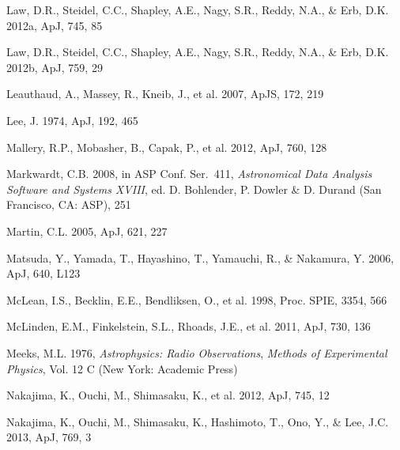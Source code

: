 \documentclass{emulateapj}
\def\apj{ApJ}
\def\apjs{ApJS}
\def\asp{ASP Conf. Ser.}
\def\spie{Proc. SPIE}
\begin{document}
\begin{thebibliography}{}
 Law, D.R., Steidel, C.C., Shapley, A.E., Nagy, S.R., Reddy, N.A., \& Erb, D.K. 2012a, \apj, 745, 85

 Law, D.R., Steidel, C.C., Shapley, A.E., Nagy, S.R., Reddy, N.A., \& Erb, D.K. 2012b, \apj, 759, 29

 Leauthaud, A., Massey, R., Kneib, J., et al. 2007, \apjs, 172, 219 

 Lee, J. 1974, \apj, 192, 465

 Mallery, R.P., Mobasher, B., Capak, P., et al. 2012, \apj, 760, 128

 Markwardt, C.B. 2008, in \asp\ 411, \textit{Astronomical Data Analysis Software and Systems XVIII}, ed. D. Bohlender, P. Dowler \& D. Durand (San Francisco, CA: ASP), 251

 Martin, C.L. 2005, \apj, 621, 227

 Matsuda, Y., Yamada, T., Hayashino, T., Yamauchi, R., \& Nakamura, Y. 2006, \apj, 640, L123 

 McLean, I.S., Becklin, E.E., Bendliksen, O., et al. 1998, \spie, 3354, 566

 McLinden, E.M., Finkelstein, S.L., Rhoads, J.E., et al. 2011, \apj, 730, 136

 Meeks, M.L. 1976, \textit{Astrophysics: Radio Observations}, \textit{Methods of Experimental Physics}, Vol. 12 C (New York: Academic Press) 

 Nakajima, K., Ouchi, M., Shimasaku, K., et al. 2012, \apj, 745, 12

 Nakajima, K., Ouchi, M., Shimasaku, K., Hashimoto, T., Ono, Y., \& Lee, J.C. 2013, \apj, 769, 3


\end{thebibliography}
\end{document}
